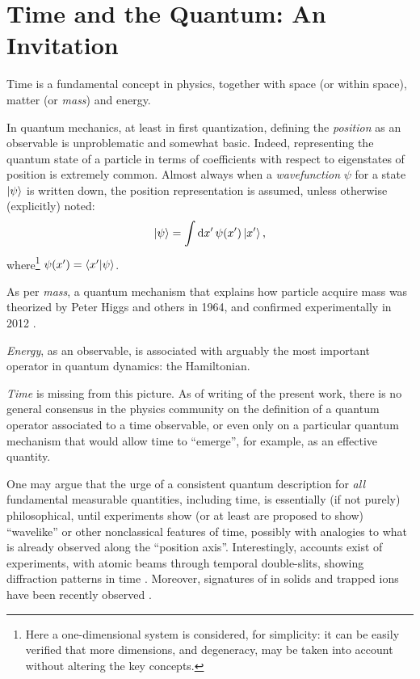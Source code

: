 \section{Time and the Quantum: An Invitation}\label{sec:intro}



\noindent
Time is a fundamental concept in physics, together with space (or  within space),
matter (or \emph{mass}) and energy.

In quantum mechanics, at least in first quantization, defining the \emph{position} as
an observable is unproblematic and somewhat basic.
Indeed, representing the quantum state of a particle
in terms of coefficients with respect to eigenstates of position is extremely common.
Almost always when a \emph{wavefunction} $\psi$
for a state $\ket{\psi}$
is written down, the {position representation}
is assumed, unless otherwise (explicitly) noted:
\begin{equation}\label{eq:positionrepr}
  \ket{\psi} = \int \dd{x'} \psi(x') \ket{x'} \text{,}
\end{equation}
where\footnote{
  Here a one-dimensional system is considered, for simplicity:
  it can be easily verified that more dimensions,
  and degeneracy, may be taken into account without altering the key concepts.
}
$\psi(x') = \braket{x'}{\psi}$.

As per \emph{mass}, a quantum mechanism that explains how particle acquire mass was theorized by
Peter Higgs and others in 1964, and confirmed experimentally in 2012
\parencite{Higgs, EnglertBrout, Kibble+, HiggsATLAS, HiggsCMS}.

\emph{Energy}, as an observable, is associated with arguably the most important operator in quantum dynamics: the Hamiltonian.

\emph{Time} is missing from this picture. As of writing of the present work,
there is no general consensus in the physics community on
the definition of a quantum operator associated to a time observable,
or even only on a particular quantum mechanism that would allow time to ``emerge'',
for example, as an effective quantity.

One may argue that the urge of a consistent quantum description for \emph{all} fundamental
measurable quantities, including time,
is essentially (if not purely)
philosophical,
until experiments show (or at least are proposed to show)
``wavelike'' or other nonclassical features of time,
possibly with analogies to what is already observed along the ``position axis''.
Interestingly, accounts exist of experiments, with atomic beams through temporal double-slits,
showing diffraction patterns in time \parencite{TemporalSlits}.
Moreover, signatures of 
in solids and trapped ions have been recently observed
\parencite{crystal.exp.ordered, crystal.exp.disordered, crystal.exp.nmr, crystal.exp}.

